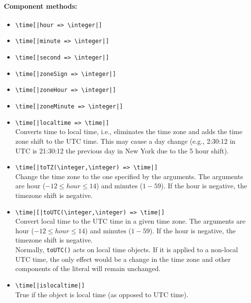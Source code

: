 \documentclass[11pt]{article}
\newcommand{\bs}{\textbackslash}
\begin{document}
\paragraph{Component methods:}
\begin{itemize}
\item {\tt \bs{}time[|hour => \bs{}integer|]}
\item {\tt \bs{}time[|minute => \bs{}integer|]}
\item {\tt \bs{}time[|second => \bs{}integer|]}
\item {\tt \bs{}time[|zoneSign => \bs{}integer|]}
\item {\tt \bs{}time[|zoneHour => \bs{}integer|]}
\item {\tt \bs{}time[|zoneMinute => \bs{}integer|] }
\item {\tt \bs{}time[|localtime => \bs{}time|]}  
  \\
  Converts time to local time, i.e., eliminates the time zone and
  adds the time zone shift to the UTC time.
  This may cause a day change
  (e.g., 2:30:12 in UTC is 21:30:12 the previous day in
  New York due to the 5 hour
  shift).
\item {\tt \bs{}time[|toTZ(\bs{}integer,\bs{}integer) => \bs{}time|]}  
  \\
  Change the time zone to the one specified by the arguments. The arguments
  are hour ($-12 \leq hour \leq 14$) and minutes ($1 - 59$).
  If the hour is negative, the timezone shift is negative.
\item {\tt \bs{}time|[|toUTC(\bs{}integer,\bs{}integer) => \bs{}time|]}  
  \\
  Convert local time to the UTC time in a given time zone.
  The arguments
  are hour ($-12 \leq hour \leq 14$) and minutes ($1 - 59$).
  If the hour is negative, the timezone shift is negative.
  \\
  Normally, \texttt{toUTC()} acts on local time objects.
  If it is applied to a non-local UTC time, the only effect would be a
  change in the time zone and other components of the literal will remain
  unchanged.
\item {\tt \bs{}time[|islocaltime|]}  
  \\
  True if the object is local time (as opposed to UTC time).
\end{itemize}
\end{document}
